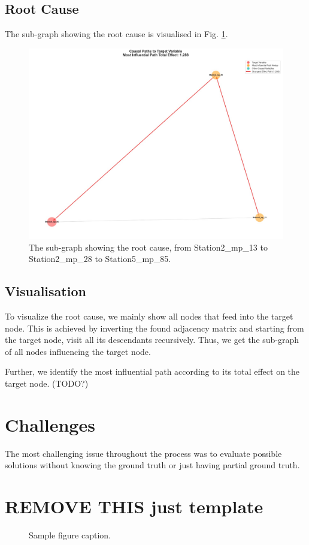 \documentclass{article}
\begin{document}
    \subsection{Root Cause}
    
    The sub-graph showing the root cause is visualised in Fig. \ref{fig:subgraph}.
    \begin{figure}
        \centering
        \includegraphics[width=0.75\linewidth]{subgraph_result.jpeg}
        \caption{The sub-graph showing the root cause, from Station2\_mp\_13 to Station2\_mp\_28 to Station5\_mp\_85.}
        \label{fig:subgraph}
    \end{figure}
    
    \subsection{Visualisation}

    To visualize the root cause, we mainly show all nodes that feed into the target node. This is achieved by inverting the found adjacency matrix and starting from the target node, visit all its descendants recursively. Thus, we get the sub-graph of all nodes influencing the target node. 

    Further, we identify the most influential path according to its total effect on the target node. (TODO?) 
    
    
    \section{Challenges} %
    The most challenging issue throughout the process was to evaluate possible solutions without knowing the ground truth or just having partial ground truth.

    \section{REMOVE THIS just template}
	
	\begin{figure}
		\centering
		\fbox{\rule[-.5cm]{0cm}{4cm} \rule[-.5cm]{4cm}{0cm}}
		\caption{Sample figure caption.}
	\end{figure}
	
	
	
	
	
	
	
	
	
	
	
	\printbibliography %
	
	
\end{document}
